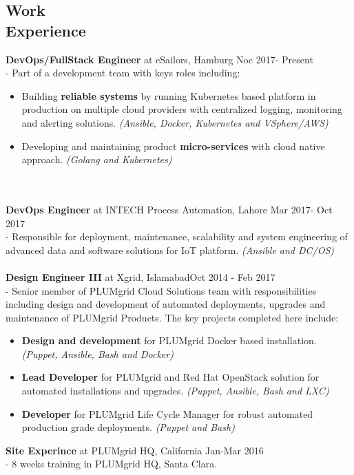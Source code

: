 \documentclass[margin]{res}
\begin{document}
\begin{resume}
\section{Work \\ Experience}
\textbf{DevOps/FullStack Engineer} at eSailors, Hamburg \hfill     Noc 2017- Present \\
- Part of a development team with keys roles including:
    \begin{itemize}
      \item Building \textbf{reliable systems} by running Kubernetes based platform in production on multiple cloud providers with centralized logging, monitoring and alerting solutions. \textit{(Ansible, Docker, Kubernetes and VSphere/AWS)}
      \item Developing and maintaining product \textbf{micro-services} with cloud native approach. \textit{(Golang and Kubernetes)}
    \end{itemize}    \\ \\
\textbf{DevOps Engineer} at INTECH Process Automation, Lahore \hfill     Mar 2017- Oct 2017 \\
- Responsible for deployment, maintenance, scalability and system engineering of advanced data and software solutions for IoT platform. \textit{(Ansible and DC/OS)}   \\ \\
{\bf Design Engineer III} at Xgrid, Islamabad\hfill     Oct 2014 - Feb 2017 \\
- Senior member of PLUMgrid Cloud Solutions team with responsibilities including design and development of automated deployments, upgrades and maintenance of PLUMgrid Products. The key projects completed here include:
    \begin{itemize}  \itemsep -2pt %
        \item \textbf{Design and development} for PLUMgrid Docker based installation. \textit{(Puppet, Ansible, Bash and Docker)}
        \item \textbf{Lead Developer} for PLUMgrid and Red Hat OpenStack solution for automated installations and upgrades. \textit{(Puppet, Ansible, Bash and LXC)}
        \item \textbf{Developer} for PLUMgrid Life Cycle Manager for robust automated production grade deployments. \textit{(Puppet and Bash)}
    \end{itemize}

\textbf{Site Experince} at PLUMgrid HQ, California \hfill     Jan-Mar 2016 \\
- 8 weeks training in PLUMgrid HQ, Santa Clara.   \\ \\


\end{resume}
\end{document}
